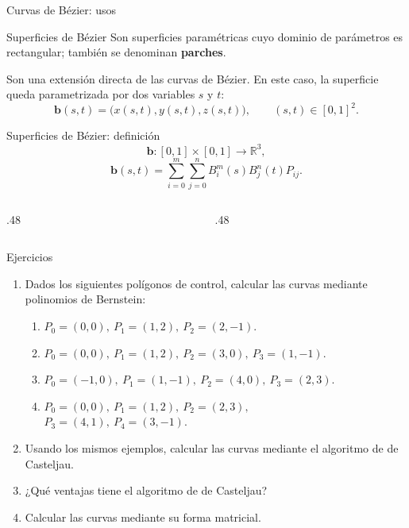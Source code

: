\documentclass[main.tex]{subfiles}
\begin{document}
\begin{frame}[t]{Curvas de Bézier: usos}
\end{frame}

\begin{frame}[t]{Superficies de Bézier}
Son superficies paramétricas cuyo dominio de parámetros es rectangular; también se denominan \textbf{parches}.\par\medskip Son una extensión directa de las curvas de Bézier. En este caso, la superficie queda parametrizada por dos variables $s$ y $t$:\[\mathbf b(s,t)=\bigl(x(s,t),y(s,t),z(s,t)\bigr),\qquad (s,t)\in[0,1]^2.\]
\end{frame}

\begin{frame}[t]{Superficies de Bézier: definición}
\small\[\mathbf b:[0,1]\times[0,1]\longrightarrow\mathbb R^3,\]\[\boxed{\mathbf b(s,t)=\sum_{i=0}^{m}\sum_{j=0}^{n}B_i^m(s)B_j^n(t)P_{ij}}.\]\begin{columns}[T]\begin{column}{.48\textwidth}\end{column}\begin{column}{.48\textwidth}\end{column}\end{columns}
\end{frame}

\begin{frame}[t]{Ejercicios}
\small\begin{enumerate}\item Dados los siguientes polígonos de control, calcular las curvas mediante polinomios de Bernstein:\begin{enumerate}\item $P_0=(0,0),\ P_1=(1,2),\ P_2=(2,-1)$.\item $P_0=(0,0),\ P_1=(1,2),\ P_2=(3,0),\ P_3=(1,-1)$.\item $P_0=(-1,0),\ P_1=(1,-1),\ P_2=(4,0),\ P_3=(2,3)$.\item $P_0=(0,0),\ P_1=(1,2),\ P_2=(2,3),$\\$P_3=(4,1),\ P_4=(3,-1)$.\end{enumerate}\item Usando los mismos ejemplos, calcular las curvas mediante el algoritmo de de Casteljau.\item ¿Qué ventajas tiene el algoritmo de de Casteljau?\item Calcular las curvas mediante su forma matricial.\end{enumerate}
\end{frame}
\end{document}
